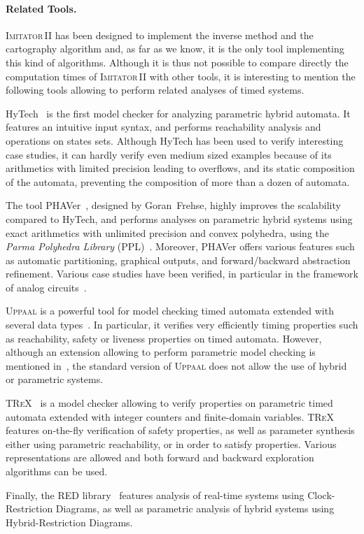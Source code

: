 \documentclass[submission,copyright,creativecommons]{eptcs}
\newcommand{\hytech}{{\sc HyTech}}
\newcommand{\imitatordeux}{\textsc{Imitator}\,II}
\newcommand{\phaver}{PHAVer}
\newcommand{\red}{RED}
\newcommand{\TReX}{\textsc{TReX}}
\newcommand{\uppaal}{\textsc{Uppaal}}
\newcommand{\paragraphe}[1]{\paragraph{#1.}}
\begin{document}
\paragraphe{Related Tools}
\imitatordeux{} has been designed to implement the inverse method and the cartography algorithm and, as far as we know, it is the only tool implementing this kind of algorithms.
Although it is thus not possible to compare directly the computation times of \imitatordeux{} with other tools, it is interesting to mention the following tools allowing to perform related analyses of timed systems.

\hytech{}~\cite{hhw97} is the first model checker for analyzing parametric hybrid automata. It features an intuitive input syntax, and performs reachability analysis and operations on states sets.
Although \hytech{} has been used to verify interesting case studies, it can hardly verify even medium sized examples because of its arithmetics with limited precision leading to overflows, and
its static composition of the automata, preventing the composition of more than a dozen of automata.

The tool \phaver{}~\cite{frehse05}, designed by Goran~Frehse, highly improves the scalability compared to \hytech{}, and performs analyses on parametric hybrid systems using exact arithmetics with unlimited precision and convex polyhedra, using the \emph{Parma Polyhedra Library} (PPL)~\cite{bhz08}.
Moreover, \phaver{} offers various features such as automatic partitioning, graphical outputs, and forward/backward abstraction refinement.
Various case studies have been verified, in particular in the framework of analog circuits~\cite{fkr06}.

\uppaal{} is a powerful tool for model checking timed automata extended with several data types~\cite{lpy97}.
In particular, it verifies very efficiently timing properties such as reachability, safety or liveness properties on timed automata.
However, although an extension allowing to perform parametric model checking is mentioned in~\cite{abbd01}, the standard version of \uppaal{} does not allow the use of hybrid or parametric systems.

\TReX{}~\cite{abs01} is a model checker allowing to verify properties on parametric timed automata extended with integer counters and finite-domain variables.
\TReX{} features on-the-fly verification of safety properties, as well as parameter synthesis either using parametric reachability, or in order to satisfy properties.
Various representations are allowed and both forward and backward exploration algorithms can be used.

Finally, the \red{} library~\cite{wang06} features analysis of real-time systems using Clock-Restriction Diagrams, as well as parametric analysis of hybrid systems using Hybrid-Restriction Diagrams.
\end{document}
